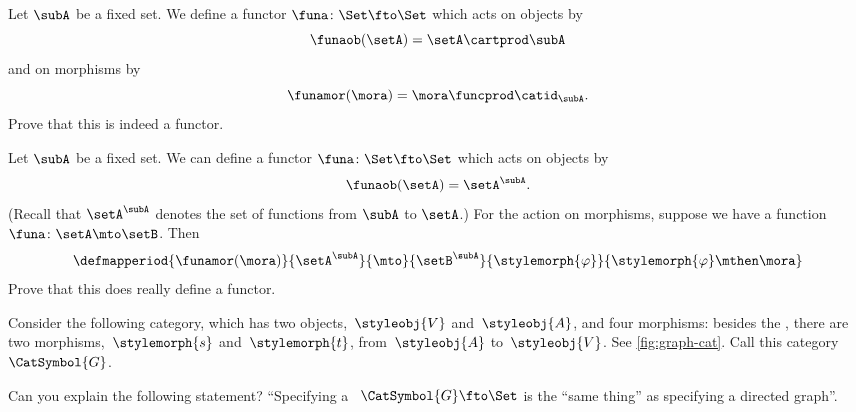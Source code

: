 \begin{gradedexercise}
    \label{ex:MultiplicationWithASet}
    Let $\subA$ be a fixed set.
    We define a functor $\funa \colon \Set \fto \Set$ which acts on objects by
    \begin{equation}
        \funaob(\setA) = \setA \cartprod \subA
    \end{equation}
    and on morphisms by
    \begin{equation}
        \funamor(\mora) = \mora \funcprod \catid_{\subA}.
    \end{equation}
    Prove that this is indeed a functor.
\end{gradedexercise}

\begin{gradedexercise}
    \label{ex:ExponentiationWithASet}
    Let $\subA$ be a fixed set.
    We can define a functor $\funa \colon \Set \fto \Set$ which acts on objects by
    \begin{equation}
        \funaob(\setA) = \setA^\subA.
    \end{equation}
    (Recall that $\setA^\subA$ denotes the set of functions from $\subA$ to $\setA$.)
    For the action on morphisms, suppose we have a function $\funa \colon \setA \mto \setB$.
    Then
    \begin{equation}
        \defmapperiod{\funamor(\mora)}{\setA^\subA}{\mto}{\setB^\subA}{\stylemorph{\varphi}}{\stylemorph{\varphi} \mthen \mora}
    \end{equation}
    Prove that this does really define a functor.
\end{gradedexercise}

\begin{gradedexercise}
    \label{ex:GraphsViaFunctors}
    Consider the following category, which has two objects,~$\styleobj{V}$ and~$\styleobj{A}$, and four morphisms: besides the , there are two morphisms,~$\stylemorph{s}$ and~$\stylemorph{t}$, from~$\styleobj{A}$ to~$\styleobj{V}$.
    See \cref{fig:graph-cat}.
    Call this category~$\CatSymbol{G}$.

    Can you explain the following statement?
    ``Specifying a ~$\CatSymbol{G} \fto \Set$ is the ``same thing'' as specifying a directed graph''.
\end{gradedexercise}

